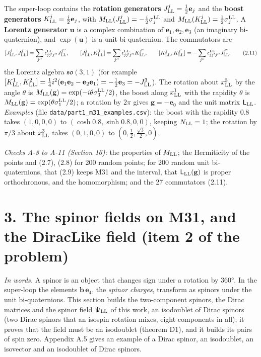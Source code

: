 \documentclass[
  10pt,
]{article}
\begin{document}
The super-loop contains the \textbf{rotation generators}
\(J^j_{\rm LL}=\tfrac12\mathbf e_j\) and the \textbf{boost generators}
\(K^j_{\rm LL}=\tfrac i2\mathbf e_j\), with
\(M_{\rm LL}(J^j_{\rm LL})=-\tfrac i2\sigma^{\rm LL}_j\) and
\(M_{\rm LL}(K^j_{\rm LL})=\tfrac12\sigma^{\rm LL}_j\). A
\textbf{Lorentz generator} \(\mathbf u\) is a complex combination of
\(\mathbf e_1,\mathbf e_2,\mathbf e_3\) (an imaginary bi-quaternion),
and \(\exp(\mathbf u)\) is a unit bi-quaternion. The commutators are
\[[J^j_{\rm LL},J^{j'}_{\rm LL}]=\sum_{j''}\epsilon^{\rm LL}_{jj'j''}J^{j''}_{\rm LL},\qquad[J^j_{\rm LL},K^{j'}_{\rm LL}]=\sum_{j''}\epsilon^{\rm LL}_{jj'j''}K^{j''}_{\rm LL},\qquad[K^j_{\rm LL},K^{j'}_{\rm LL}]=-\sum_{j''}\epsilon^{\rm LL}_{jj'j''}J^{j''}_{\rm LL},\tag{2.11}\]
the Lorentz algebra \(\mathfrak{so}(3,1)\) (for example
\([K^1_{\rm LL},K^2_{\rm LL}]=\tfrac14i^2(\mathbf e_1\mathbf e_2-\mathbf e_2\mathbf e_1)=-\tfrac12\mathbf e_3=-J^3_{\rm LL}\)).
The rotation about \(x^3_{\rm LL}\) by the angle \(\theta\) is
\(M_{\rm LL}(\mathbf g)=\exp(-i\theta\sigma^{\rm LL}_3/2)\), the boost
along \(x^1_{\rm LL}\) with the rapidity \(\theta\) is
\(M_{\rm LL}(\mathbf g)=\exp(\theta\sigma^{\rm LL}_1/2)\); a rotation by
\(2\pi\) gives \(\mathbf g=-\mathbf e_0\) and the unit matrix
\(\mathsf L_{\rm LL}\). \emph{Examples} (file
\texttt{data/part1\_m31\_examples.csv}): the boost with the rapidity 0.8
takes \((1,0,0,0)\) to \((\cosh0.8,\sinh0.8,0,0)\), keeping
\(N_{\rm LL}=1\); the rotation by \(\pi/3\) about \(x^3_{\rm LL}\) takes
\((0,1,0,0)\) to \((0,\tfrac12,\tfrac{\sqrt3}2,0)\).

\emph{Checks A-8 to A-11 (Section 16):} the properties of
\(M_{\rm LL}\); the Hermiticity of the points and (2.7), (2.8) for 200
random points; for 200 random unit bi-quaternions, that (2.9) keeps M31
and the interval, that \(\mathsf L_{\rm LL}(\mathbf g)\) is proper
orthochronous, and the homomorphism; and the 27 commutators (2.11).

\hypertarget{the-spinor-fields-on-m31-and-the-diraclike-field-item-2-of-the-problem}{%
\section{3. The spinor fields on M31, and the DiracLike field (item 2 of
the
problem)}\label{the-spinor-fields-on-m31-and-the-diraclike-field-item-2-of-the-problem}}

\emph{In words.} A spinor is an object that changes sign under a
rotation by \(360°\). In the super-loop the elements
\(\mathbf b\,\mathbf e_4\), the \emph{spinor charges}, transform as
spinors under the unit bi-quaternions. This section builds the
two-component spinors, the Dirac matrices and the spinor field
\(\Psi_{\rm LL}\) of this work, an isodoublet of Dirac spinors (two
Dirac spinors that an isospin rotation mixes, eight components in all);
it proves that the field must be an isodoublet (theorem D1), and it
builds its pairs of spin zero. Appendix A.5 gives an example of a Dirac
spinor, an isodoublet, an isovector and an isodoublet of Dirac spinors.
\end{document}
